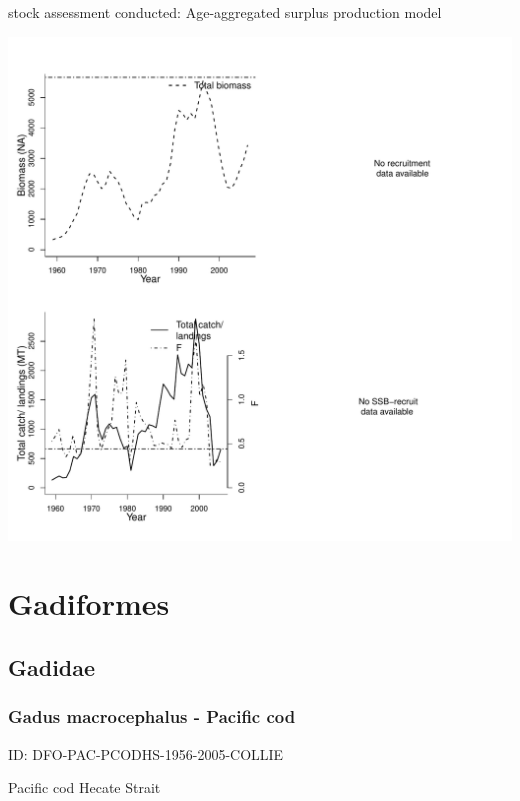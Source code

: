 stock assessment conducted: Age-aggregated surplus production model 
\begin{center}
\vspace{-0.2cm}\includegraphics[scale=0.65]{../tex/figures/plot-RIDEM-LOBSTERRI-1959-2007-COLLIE.pdf}
\end{center}

\newpage
\section{Gadiformes}

\subsection{Gadidae}

\subsubsection{Gadus macrocephalus - Pacific cod}
ID: DFO-PAC-PCODHS-1956-2005-COLLIE

Pacific cod Hecate Strait 

